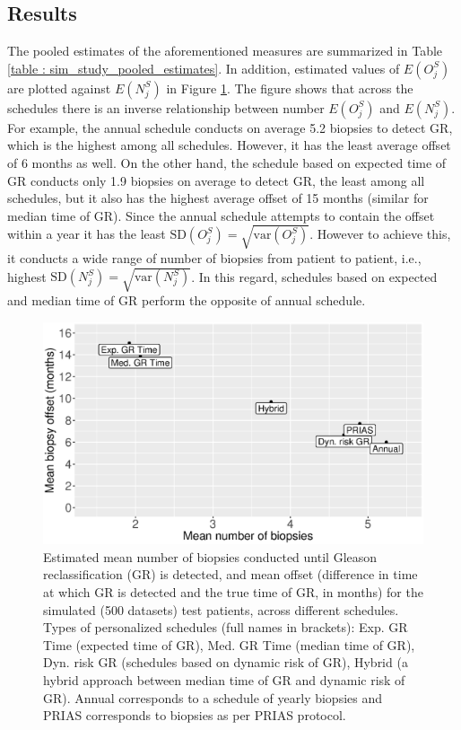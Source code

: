 \subsection{Results}
The pooled estimates of the aforementioned measures are summarized in Table \ref{table : sim_study_pooled_estimates}. In addition, estimated values of $E(O^S_j)$ are plotted against $E(N^S_j)$ in Figure \ref{fig : meanNbVsOffset}. The figure shows that across the schedules there is an inverse relationship between number $E(O^S_j)$ and $E(N^S_j)$. For example, the annual schedule conducts on average 5.2 biopsies to detect GR, which is the highest among all schedules. However, it has the least average offset of 6 months as well. On the other hand, the schedule based on expected time of GR conducts only 1.9 biopsies on average to detect GR, the least among all schedules, but it also has the highest average offset of 15 months (similar for median time of GR). Since the annual schedule attempts to contain the offset within a year it has the least $\mbox{SD}(O^S_j) = \sqrt{\mbox{var}(O^S_j)}$. However to achieve this, it conducts a wide range of number of biopsies from patient to patient, i.e., highest $\mbox{SD}(N^S_j) = \sqrt{\mbox{var}(N^S_j)}$. In this regard, schedules based on expected and median time of GR perform the opposite of annual schedule.

\begin{figure}
\centerline{\includegraphics[width=\columnwidth]{meanNbVsOffset_all.eps}}
\caption{Estimated mean number of biopsies conducted until Gleason reclassification (GR) is detected, and mean offset (difference in time at which GR is detected and the true time of GR, in months) for the simulated (500 datasets) test patients, across different schedules. Types of personalized schedules (full names in brackets): Exp. GR Time (expected time of GR), Med. GR Time (median time of GR), Dyn. risk GR (schedules based on dynamic risk of GR), Hybrid (a hybrid approach between median time of GR and dynamic risk of GR). Annual corresponds to a schedule of yearly biopsies and PRIAS corresponds to biopsies as per PRIAS protocol.}
\label{fig : meanNbVsOffset}
\end{figure}

